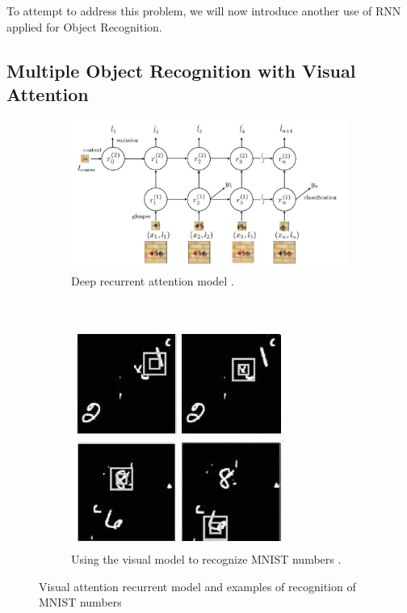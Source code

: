 \documentclass[11pt]{sdm}
\begin{document}
To attempt to address this problem, we will now introduce another use of RNN applied for Object Recognition.

\subsection{Multiple Object Recognition with Visual Attention}

\begin{figure}[t!]
  \centering
  \begin{subfigure}[t]{0.5\textwidth}
    \centering
    \includegraphics[scale=0.8]{img/attention_model}
    \caption{\label{attention_model} Deep recurrent attention model \cite{ba_multiple_2014}. }
  \end{subfigure}%
  ~
  \begin{subfigure}[t]{0.5\linewidth}
    \centering
    \includegraphics[scale=1.5]{img/mnist}
    \caption{\label{mnist} Using the visual model to recognize MNIST numbers \cite{ba_multiple_2014}. }
  \end{subfigure}
  \caption{Visual attention recurrent model and examples of recognition of MNIST numbers}
\end{figure}
\end{document}
